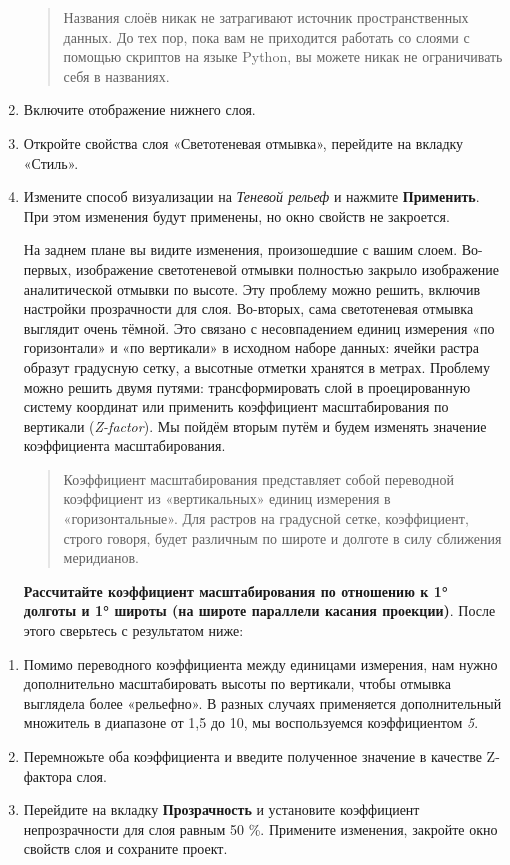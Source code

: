 \documentclass[
  12pt,
]{book}
\begin{document}
\begin{enumerate}
  \begin{quote}
  Названия слоёв никак не затрагивают источник пространственных данных. До тех пор, пока вам не приходится работать со слоями с помощью скриптов на языке Python, вы можете никак не ограничивать себя в названиях.
  \end{quote}
\item
  Включите отображение нижнего слоя.
\item
  Откройте свойства слоя «Светотеневая отмывка», перейдите на вкладку «Стиль».
\item
  Измените способ визуализации на \emph{Теневой рельеф} и нажмите \textbf{Применить}. При этом изменения будут применены, но окно свойств не закроется.

  На заднем плане вы видите изменения, произошедшие с вашим слоем. Во-первых, изображение светотеневой отмывки полностью закрыло изображение аналитической отмывки по высоте. Эту проблему можно решить, включив настройки прозрачности для слоя. Во-вторых, сама светотеневая отмывка выглядит очень тёмной. Это связано с несовпадением единиц измерения «по горизонтали» и «по вертикали» в исходном наборе данных: ячейки растра образут градусную сетку, а высотные отметки хранятся в метрах. Проблему можно решить двумя путями: трансформировать слой в проецированную систему координат или применить коэффициент масштабирования по вертикали (\emph{Z-factor}). Мы пойдём вторым путём и будем изменять значение коэффициента масштабирования.

  \begin{quote}
  Коэффициент масштабирования представляет собой переводной коэффициент из «вертикальных» единиц измерения в «горизонтальные». Для растров на градусной сетке, коэффициент, строго говоря, будет различным по широте и долготе в силу сближения меридианов.
  \end{quote}

  \textbf{Рассчитайте коэффициент масштабирования по отношению к 1° долготы и 1° широты (на широте параллели касания проекции)}. После этого сверьтесь с результатом ниже:
\end{enumerate}

\begin{enumerate}
\def\labelenumi{\arabic{enumi}.}
\setcounter{enumi}{12}
\item
  Помимо переводного коэффициента между единицами измерения, нам нужно дополнительно масштабировать высоты по вертикали, чтобы отмывка выглядела более «рельефно». В разных случаях применяется дополнительный множитель в диапазоне от 1,5 до 10, мы воспользуемся коэффициентом \emph{5}.
\item
  Перемножьте оба коэффициента и введите полученное значение в качестве Z-фактора слоя.
\item
  Перейдите на вкладку \textbf{Прозрачность} и установите коэффициент непрозрачности для слоя равным 50 \%. Примените изменения, закройте окно свойств слоя и сохраните проект.
\end{enumerate}
\end{document}
